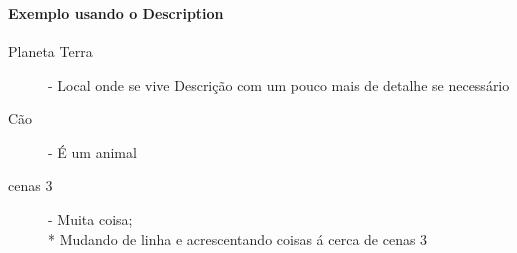 \documentclass[a4paper,11pt]{article}%
\begin{document}
\paragraph{\ \ } 
\paragraph{Exemplo usando o Description} 
\begin{description}
	\item [Planeta Terra] - Local onde se vive
	\newline Descrição com um pouco mais de detalhe se necessário
	\item [Cão] - É um animal
	\item [cenas 3] - Muita coisa;
	\\* Mudando de linha e acrescentando coisas á cerca de cenas 3
\end{description}


\paragraph {\ \ }


\newpage
\end{document}

